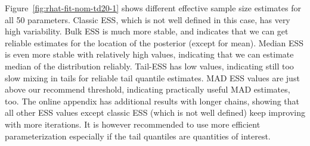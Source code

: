 \documentclass[american,]{article}
\begin{document}
Figure~\ref{fig:rhat-fit-nom-td20-1} shows different effective sample
size estimates for all 50 parameters. Classic ESS, which is not well
defined in this case, has very high variability. Bulk ESS is much more
stable, and indicates that we can get reliable estimates for the
location of the posterior (except for mean). Median ESS is even more
stable with relatively high values, indicating that we can estimate
median of the distribution reliably. Tail-ESS has low values,
indicating still too slow mixing in tails for reliable tail quantile
estimates. MAD ESS values are just above our recommend threshold,
indicating practically useful MAD estimates, too. The online appendix
has additional results with longer chains, showing that all other ESS
values except classic ESS (which is not well defined) keep improving
with more iterations. It is however recommended to use more efficient
parameterization especially if the tail quantiles are quantities of
interest.







\end{document}
